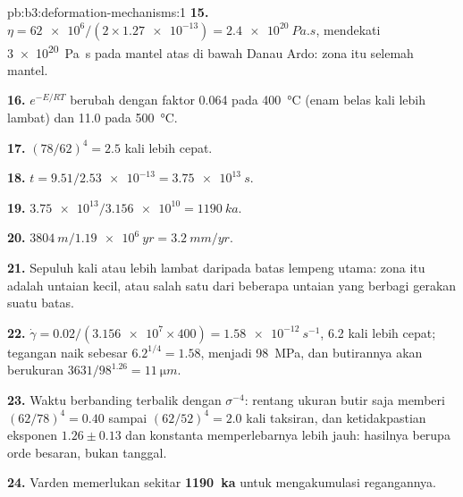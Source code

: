 \begin{solution}{pb:b3:deformation-mechanisms:1}
\textbf{15.} $\eta = \num{62e6}/(2\times\num{1.27e-13}) = \qty{2.4e20}{Pa.s}$,
mendekati \qty{3e20}{Pa.s} pada mantel atas di bawah Danau Ardo: zona itu
selemah mantel.

\textbf{16.} $e^{-E/RT}$ berubah dengan faktor 0.064 pada \qty{400}{\celsius}
(enam belas kali lebih lambat) dan 11.0 pada \qty{500}{\celsius}.

\textbf{17.} $(78/62)^4 = 2.5$ kali lebih cepat.

\textbf{18.} $t = 9.51/\num{2.53e-13} = \qty{3.75e13}{s}$.

\textbf{19.} $\num{3.75e13}/\num{3.156e10} = \qty{1190}{ka}$.

\textbf{20.} $\qty{3804}{m}/\qty{1.19e6}{yr} = \qty{3.2}{mm/yr}$.

\textbf{21.} Sepuluh kali atau lebih lambat daripada batas lempeng utama: zona itu
adalah untaian kecil, atau salah satu dari beberapa untaian yang berbagi gerakan suatu batas.

\textbf{22.} $\dot\gamma = 0.02/(\num{3.156e7}\times400) = \qty{1.58e-12}{s^{-1}}$,
6.2 kali lebih cepat; tegangan naik sebesar $6.2^{1/4} = 1.58$, menjadi \qty{98}{MPa}, dan
butirannya akan berukuran $3631/98^{1.26} = \qty{11}{\micro m}$.

\textbf{23.} Waktu berbanding terbalik dengan $\sigma^{-4}$: rentang ukuran butir saja memberi
$(62/78)^4 = 0.40$ sampai $(62/52)^4 = 2.0$ kali taksiran, dan
ketidakpastian eksponen $1.26 \pm 0.13$ dan konstanta 
memperlebarnya lebih jauh: hasilnya berupa orde besaran, bukan tanggal.

\textbf{24.}  Varden memerlukan sekitar
\textbf{\qty[text-series-to-math=true]{1190}{ka}} untuk mengakumulasi regangannya.
\end{solution}
